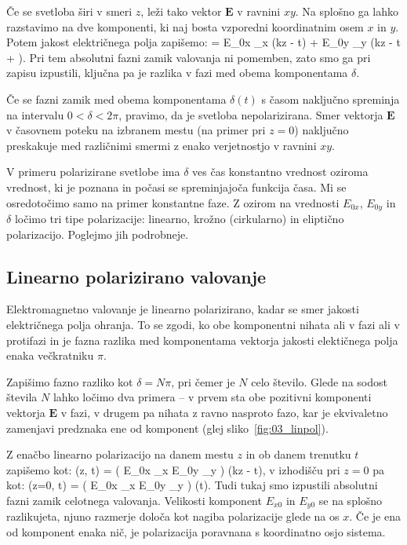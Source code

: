 Če se svetloba širi v smeri $z$, leži tako vektor $\mathbf{E}$ v ravnini $xy$. 
Na splošno ga lahko razstavimo na dve komponenti, ki naj bosta
vzporedni koordinatnim osem $x$ in $y$. Potem jakost električnega
polja zapišemo:
\beq
{} = E_{0x} _x \cos \left(kz - \omega t\right) + 
E_{0y} _y \cos \left(kz - \omega t + \delta\right).
\label{eq:03_37}
\eeq
Pri tem absolutni fazni zamik valovanja ni pomemben, zato smo ga 
pri zapisu izpustili, ključna pa je razlika v fazi med obema 
komponentama $\delta$.

Če se fazni zamik med obema komponentama $\delta(t)$ s časom 
naključno spreminja na intervalu $0<\delta <2\pi$, pravimo, da je 
svetloba nepolarizirana. Smer vektorja $\mathbf{E}$ v časovnem 
poteku na izbranem mestu (na primer pri $z=0$) naključno preskakuje med
različnimi smermi z enako verjetnostjo v ravnini $xy$.

V primeru polarizirane svetlobe ima $\delta$ ves čas konstantno 
vrednost oziroma vrednost, ki je poznana in počasi se spreminjajoča 
funkcija časa. Mi se osredotočimo samo na primer konstantne faze. 
Z ozirom na vrednosti $E_{0x}$, $E_{0y}$ in $\delta$ ločimo tri tipe
polarizacije: linearno, krožno (cirkularno) in eliptično polarizacijo. 
Poglejmo jih podrobneje.

\subsection*{Linearno polarizirano valovanje}
Elektromagnetno valovanje je linearno polarizirano, kadar se smer jakosti
električnega polja ohranja. To se zgodi, ko obe komponentni nihata
ali v fazi ali v protifazi in je fazna razlika med komponentama vektorja 
jakosti elektičnega polja enaka večkratniku $\pi$. 

Zapišimo fazno razliko kot $\delta = N\pi$, pri čemer je $N$ celo število. 
Glede na sodost števila $N$ lahko ločimo dva primera -- v prvem sta obe pozitivni komponenti
vektorja $\mathbf{E}$ v fazi, v drugem pa nihata z ravno nasproto fazo, kar je ekvivaletno 
zamenjavi predznaka ene od komponent (glej sliko~\ref{fig:03_linpol}). 

Z enačbo linearno polarizacijo na danem mestu $z$ in ob danem trenutku $t$ zapišemo
kot:
\beq
{} (z, t) = \left( E_{0x} _x \pm E_{0y} _y \right)
\cos \left(kz - \omega t\right),
\label{eq:03_38}
\eeq
v izhodišču pri $z=0$ pa kot:
\beq
{} (z=0, t) = \left( E_{0x} _x \pm E_{0y} _y \right)
\cos \left(\omega t\right).
\label{eq:03_39}
\eeq
Tudi tukaj smo izpustili absolutni fazni zamik celotnega valovanja. 
Velikosti komponent $E_{x0}$ in $E_{y0}$ se na splošno razlikujeta, njuno razmerje
določa kot nagiba polarizacije glede na os $x$. Če je ena od komponent enaka nič, je 
polarizacija poravnana s koordinatno osjo sistema.

